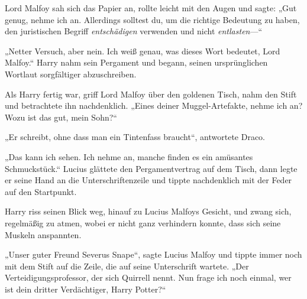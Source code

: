 Lord Malfoy sah sich das Papier an, rollte leicht mit den Augen und sagte: „Gut genug, nehme ich an. Allerdings solltest du, um die richtige Bedeutung zu haben, den juristischen Begriff \emph{entschädigen} verwenden und nicht \emph{entlasten}—“

„Netter Versuch, aber nein. Ich weiß genau, was dieses Wort bedeutet, Lord Malfoy.“ Harry nahm sein Pergament und begann, seinen ursprünglichen Wortlaut sorgfältiger abzuschreiben.

Als Harry fertig war, griff Lord Malfoy über den goldenen Tisch, nahm den Stift und betrachtete ihn nachdenklich. „Eines deiner Muggel-Artefakte, nehme ich an? Wozu ist das gut, mein Sohn?“

„Er schreibt, ohne dass man ein Tintenfass braucht“, antwortete Draco.

„Das kann ich sehen. Ich nehme an, manche finden es ein amüsantes Schmuckstück.“ Lucius glättete den Pergamentvertrag auf dem Tisch, dann legte er seine Hand an die Unterschriftenzeile und tippte nachdenklich mit der Feder auf den Startpunkt.

Harry riss seinen Blick weg, hinauf zu Lucius Malfoys Gesicht, und zwang sich, regelmäßig zu atmen, wobei er nicht ganz verhindern konnte, dass sich seine Muskeln anspannten.

„Unser guter Freund Severus Snape“, sagte Lucius Malfoy und tippte immer noch mit dem Stift auf die Zeile, die auf seine Unterschrift wartete. „Der Verteidigungsprofessor, der sich Quirrell nennt. Nun frage ich noch einmal, wer ist dein dritter Verdächtiger, Harry Potter?“

